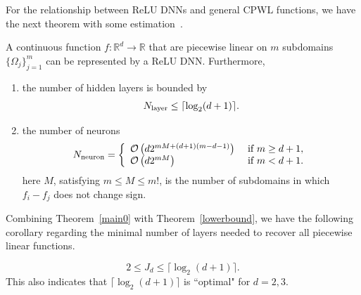 For the relationship between ReLU DNNs and general CPWL functions, we have the next theorem with some estimation~\cite{arora2016understanding}. 
\begin{theorem}\label{main0}
	A continuous function $f:\mathbb{R}^d\to\mathbb{R}$ that are piecewise linear on $m$ subdomains $\{\Omega_j\}_{j=1}^m$ can be represented by a ReLU DNN. 
	Furthermore, 
	\begin{enumerate}
		\item the number of  hidden layers  is bounded by 
		\begin{equation}
		\label{layer}
		N_{\rm layer}\le \lceil \log_2(d+1)\rceil.      
		\end{equation}
		\item the number of neurons 
		\begin{equation}
		\label{neurons}
		N_{\rm neuron}=
		\left\{
		\begin{array}{ll}
		\mathcal  O\left(d2^{mM+(d+1)(m-d-1)}\right) & \mbox{ if } m\ge d+1,\\     
		\mathcal O\left(d2^{mM}\right) & \mbox{ if } m< d+1.
		\end{array}
		\right.
		\end{equation}
		here $M$, satisfying $m\le M\le m!$, is the number of subdomains in which $f_i-f_j$ does not change sign. 
	\end{enumerate}
\end{theorem}
Combining Theorem~\ref{main0} with Theorem~\ref{lowerbound}, we have the following corollary regarding the minimal number of layers needed to recover all piecewise linear functions.

\begin{corollary}
	\begin{equation}
	2 \le J_d \le \lceil\log_2(d+1)\rceil.
	\end{equation}
	This also indicates that $\lceil\log_2(d+1)\rceil$ is ``optimal" for $d=2,3$.
\end{corollary}



\endinput 

